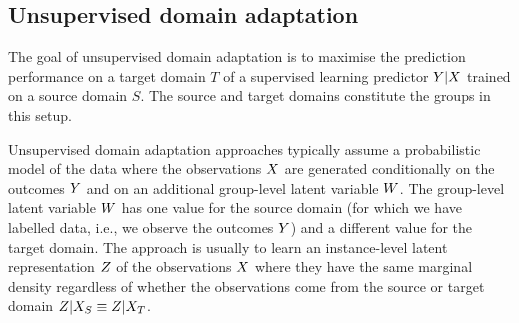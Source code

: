 \documentclass[../thesis.tex]{subfiles}
\begin{document}

\subsection{Unsupervised domain adaptation}

The goal of unsupervised domain adaptation is to maximise the prediction performance on a target domain $T$ of a supervised learning predictor $\myrv{y} | \myrv{x}$ trained on a source domain $S$. The source and target domains constitute the groups in this setup.

Unsupervised domain adaptation approaches typically assume a probabilistic model of the data where the observations $\myrv{x}$ are generated conditionally on the outcomes $\myrv{y}$ and on an additional group-level latent variable $\myrv{w}$. The group-level latent variable $\myrv{w}$ has one value for the source domain (for which we have labelled data, i.e., we observe the outcomes $\myrv{y}$) and a different value for the target domain. The approach is usually to learn an instance-level latent representation $\myrv{z}$ of the observations $\myrv{x}$ where they have the same marginal density regardless of whether the observations come from the source or target domain $\myrv{z} | \myrv{x}_S \equiv \myrv{z} | \myrv{x}_T$.
\end{document}
